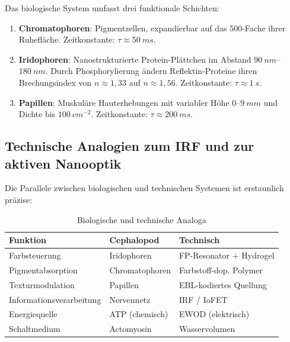 ﻿\documentclass[a4paper,12pt]{scrreprt}
\theoremstyle{definition}
\begin{document}
Das biologische System umfasst drei funktionale Schichten:
\begin{enumerate}[leftmargin=*, label=\textbf{\arabic*.}]
  \item \textbf{Chromatophoren}: Pigmentzellen, expandierbar auf das 500-Fache
    ihrer Ruhefläche. Zeitkonstante: $\tau \approx \SI{50}{ms}$.
  \item \textbf{Iridophoren}: Nanostrukturierte Protein-Plättchen im Abstand
    $\SI{90}{nm}$--$\SI{180}{nm}$. Durch Phosphorylierung ändern Reflektin-Proteine
    ihren Brechungsindex von $n \approx 1{,}33$ auf $n \approx 1{,}56$.
    Zeitkonstante: $\tau \approx \SI{1}{s}$.
  \item \textbf{Papillen}: Muskuläre Hauterhebungen mit variabler Höhe
    $0$--$\SI{9}{mm}$ und Dichte bis $\SI{100}{cm^{-2}}$.
    Zeitkonstante: $\tau \approx \SI{200}{ms}$.
\end{enumerate}

\subsection{Technische Analogien zum IRF und zur aktiven Nanooptik}

Die Parallele zwischen biologischen und technischen Systemen ist erstaunlich präzise:

\begin{table}[h!]
  \scriptsize
  \centering
  \caption{Biologische und technische Analoga}
  \label{tab:analogien}
  \begin{tabular}{p{3.5cm}p{4cm}p{4cm}}
    \toprule
    \textbf{Funktion} & \textbf{Cephalopod} & \textbf{Technisch} \\
    \midrule
    Farbsteuerung     & Iridophoren          & FP-Resonator + Hydrogel \\
    Pigmentabsorption & Chromatophoren       & Farbstoff-dop. Polymer \\
    Texturmodulation  & Papillen             & EBL-kodiertes Quellung \\
    Informationsverarbeitung & Nervennetz    & IRF / IoFET \\
    Energiequelle     & ATP (chemisch)       & EWOD (elektrisch) \\
    Schaltmedium      & Actomyosin           & Wasservolumen \\
    \bottomrule
  \end{tabular}
\end{table}

\end{document}
